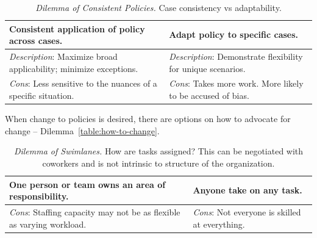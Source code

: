 \begin{center}
\begin{table}[H] %
\begin{tabular}{ | m{\dilemmatablewidth}| m{\dilemmatablewidth} | }
  \hline
  \textbf{Consistent application of policy across cases.} &
  \textbf{Adapt policy to specific cases.} \\
  \hline
  \textit{Description}: Maximize broad applicability; minimize exceptions. &
  \textit{Description}: Demonstrate flexibility for unique scenarios. \\  
  \hline
  \textit{Cons}: Less sensitive to the nuances of a specific situation. & 
  \textit{Cons}: Takes more work. More likely to be accused of bias. \\
  \hline
\end{tabular}
\caption{
\textit{Dilemma of Consistent Policies.}
Case consistency vs adaptability.
}
\label{table:policy-consistency-across-cases}
\end{table}
\end{center}

When change to policies is desired, there are options on how to advocate for change -- Dilemma~\ref{table:how-to-change}.



\begin{center}
\begin{table}[H] %
\begin{tabular}{ | m{\dilemmatablewidth}| m{\dilemmatablewidth} | } 
  \hline
  \textbf{One person or team owns an area of responsibility.} & 
  \textbf{Anyone take on any task.} \\ 
  \hline
  \textit{Cons}: Staffing capacity may not be as flexible as varying workload. & 
  \textit{Cons}: Not everyone is skilled at everything. \\  
  \hline
\end{tabular}
\caption{
\textit{Dilemma of Swimlanes.} 
How are tasks assigned? This can be negotiated with coworkers and is not intrinsic to structure of the organization. 
}
\label{table:swimlanes}
\end{table}
\end{center}


